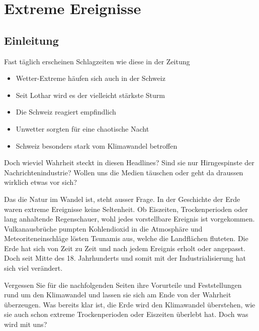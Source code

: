 %
%
%
\chapter{Extreme Ereignisse\label{chapter:thema}}
\begin{refsection}


\section{Einleitung}
Fast täglich erscheinen Schlagzeiten wie diese in der Zeitung

\begin{itemize}
\item Wetter-Extreme häufen sich auch in der Schweiz
\item Seit Lothar wird es der vielleicht stärkste Sturm
\item Die Schweiz reagiert empfindlich
\item Unwetter sorgten für eine chaotische Nacht
\item Schweiz besonders stark vom Klimawandel betroffen
\end{itemize}

Doch wieviel Wahrheit steckt in diesen Headlines? Sind sie nur Hirngespinste der Nachrichtenindustrie? Wollen uns die Medien täuschen oder geht da draussen wirklich etwas vor sich?

Das die Natur im Wandel ist, steht ausser Frage. In der Geschichte der Erde waren extreme Ereignisse keine Seltenheit. Ob Eiszeiten, Trockenperioden oder lang anhaltende Regenschauer, wohl jedes vorstellbare Ereignis ist vorgekommen. Vulkanausbrüche pumpten Kohlendioxid in die Atmosphäre und Meteoriteneinschläge lösten Tsunamis aus, welche die Landflächen fluteten. Die Erde hat sich von Zeit zu Zeit und nach jedem Ereignis erholt oder angepasst. Doch seit Mitte des 18. Jahrhunderts und somit mit der Industrialisierung hat sich viel verändert.

Vergessen Sie für die nachfolgenden Seiten ihre Vorurteile und Feststellungen rund um den Klimawandel und lassen sie sich am Ende von der Wahrheit überzeugen. Was bereits klar ist, die Erde wird den Klimawandel überstehen, wie sie auch schon extreme Trockenperioden oder Eiszeiten überlebt hat. Doch was wird mit uns?



\end{refsection}
